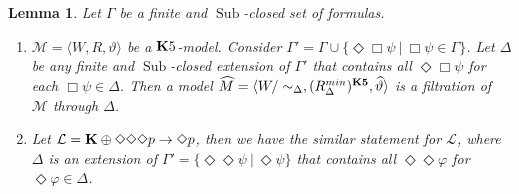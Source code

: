 \documentclass[a4paper]{article}
\theoremstyle{defin}
\theoremstyle{theorem}
\theoremstyle{prop}
\theoremstyle{lemma}
\newtheorem{lemma}{Lemma}
\theoremstyle{fact}
\theoremstyle{ex}
\theoremstyle{col}
\theoremstyle{claim}
\begin{document}
\begin{lemma}\label{extension}
  Let $\Gamma$ be a finite and $\operatorname{Sub}$-closed set of formulas.

  \begin{enumerate}
  \item  $\mathcal{M} = \langle W, R, \vartheta \rangle$ be a ${\bf K}5$-model. Consider $\Gamma' = \Gamma \cup \{ \Diamond \Box \psi \: | \: \Box \psi \in \Gamma \}$. Let $\Delta$ be any finite and $\operatorname{Sub}$-closed extension of $\Gamma'$ that contains all $\Diamond \Box \psi$ for each $\Box \psi \in \Delta$. Then a model $\widehat{M} = \langle W / \sim_{\Delta}, (R^{min}_{\Delta})^{\bf K5}, \widehat{\vartheta} \rangle$ is a filtration of $\mathcal{M}$ through $\Delta$.
  \item Let $\mathcal{L} = {\bf K} \oplus \Diamond \Diamond \Diamond p \to \Diamond p$, then we have the similar statement for $\mathcal{L}$, where $\Delta$ is an extension of $\Gamma' = \{ \Diamond \Diamond \psi \: | \: \Diamond \psi \}$ that contains all $\Diamond \Diamond \varphi$ for $\Diamond \varphi \in \Delta$.
  \end{enumerate}
\end{lemma}
\end{document}
